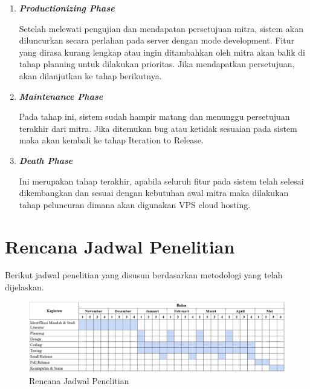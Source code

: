 \begin{enumerate}
\begin{enumerate}[label*=\arabic*.]
\begin{enumerate}[label*=\arabic*.]
            \item \textbf{\textit{Productionizing Phase}}
            
            Setelah melewati pengujian dan mendapatan persetujuan mitra, sistem akan diluncurkan secara perlahan pada server dengan mode development. Fitur yang dirasa kurang lengkap atau ingin ditambahkan oleh mitra akan balik di tahap planning untuk dilakukan prioritas. Jika mendapatkan persetujuan, akan dilanjutkan ke tahap berikutnya.

            \item \textbf{\textit{Maintenance Phase}}
            
            Pada tahap ini, sistem sudah hampir matang dan menunggu persetujuan terakhir dari mitra. Jika ditemukan bug atau ketidak sesuaian pada sistem maka akan kembali ke tahap Iteration to Release.

            \item \textbf{\textit{Death Phase}}
            
            Ini merupakan tahap terakhir, apabila seluruh fitur pada sistem telah selesai dikembangkan dan sesuai dengan kebutuhan awal mitra maka dilakukan tahap peluncuran dimana akan digunakan VPS cloud hosting.
        
        \end{enumerate}
    \end{enumerate}
\end{enumerate}

\section{Rencana Jadwal Penelitian}

\noindent Berikut jadwal penelitian yang disusun berdasarkan metodologi yang telah dijelaskan.

\begin{figure}[!h]
    \includegraphics[width=1.2\linewidth, center]{images/metode/schedule.png}
    \caption{Rencana Jadwal Penelitian}
    \label{fig:flow-schedule}
\end{figure}